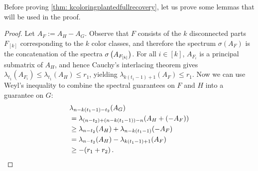 Before proving \cref{thm: kcoloringplantedfullrecovery}, let us prove some lemmas that will be used in the proof.


\begin{proof}
    Let $A_F:= A_H-A_G$.
    Observe that $F$ consists of the $k$ disconnected parts $F_{[k]}$ corresponding to the $k$ color classes, and therefore the spectrum $\sigma(A_F)$ is the concatenation of the spectra $\sigma\left(A_{F_{[k]}}\right)$.
    For all $i\in [k]$, $A_{F_i}$ is a principal submatrix of $A_H$, and hence Cauchy's interlacing theorem gives $\lambda_{t_1}(A_{F_i})\leq \lambda_{t_1}(A_H)\leq r_1$, yielding $\lambda_{k(t_1-1)+1}(A_F)\leq r_1$.
    Now we can use Weyl's inequality to combine the spectral guarantees on $F$ and $H$ into a guarantee on $G$:
    \begin{align*}
        &\lambda_{n-k(t_1-1)-t_2}(A_G)\\
        &=\lambda_{(n-t_2)+\left(n-k(t_1-1)\right)-n}(A_H+(-A_F))\\
        &\geq \lambda_{n-t_2}(A_H)+\lambda_{n-k(t_1-1)}(-A_F)\\
        &= \lambda_{n-t_2}(A_H)-\lambda_{k(t_1-1)+1}(A_F)\\
        &\geq -(r_1+r_2)\,.
    \end{align*}
\end{proof}

